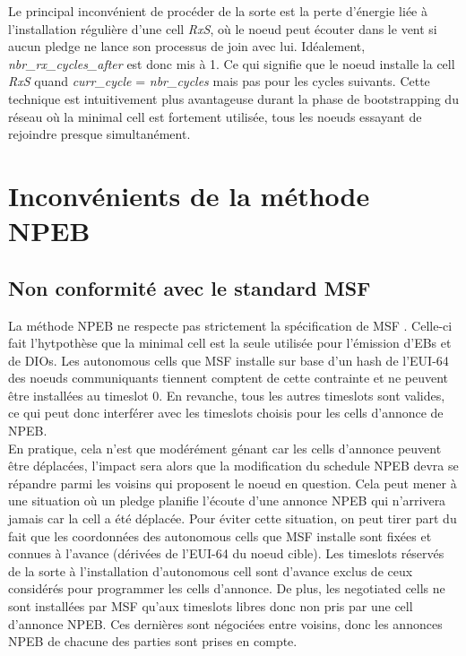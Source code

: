 \documentclass[]{report}
\begin{document}
Le principal inconvénient de procéder de la sorte est la perte d'énergie liée à l'installation régulière d'une cell \textit{RxS}, où le noeud peut écouter dans le vent si aucun pledge ne lance son processus de join avec lui. Idéalement, \textit{nbr\_rx\_cycles\_after} est donc mis à 1. Ce qui signifie que le noeud installe la cell \textit{RxS} quand \textit{curr\_cycle} = \textit{nbr\_cycles} mais pas pour les cycles suivants. Cette technique est intuitivement plus avantageuse durant la phase de bootstrapping du réseau où la minimal cell est fortement utilisée, tous les noeuds essayant de rejoindre presque simultanément.

\newpage

\section{Inconvénients de la méthode NPEB}

\subsection{Non conformité avec le standard MSF}

La méthode NPEB ne respecte pas strictement la spécification de MSF \cite{ietf-6tisch-msf-10}. Celle-ci fait l'hytpothèse que la minimal cell est la seule utilisée pour l'émission d'EBs et de DIOs. Les autonomous cells que MSF installe sur base d'un hash de l'EUI-64 des noeuds communiquants tiennent comptent de cette contrainte et ne peuvent être installées au timeslot 0. En revanche, tous les autres timeslots sont valides, ce qui peut donc interférer avec les timeslots choisis pour les cells d'annonce de NPEB.\\

En pratique, cela n'est que modérément génant car les cells d'annonce peuvent être déplacées, l'impact sera alors que la modification du schedule NPEB devra se répandre parmi les voisins qui proposent le noeud en question. Cela peut mener à une situation où un pledge planifie l'écoute d'une annonce NPEB qui n'arrivera jamais car la cell a été déplacée. Pour éviter cette situation, on peut tirer part du fait que les coordonnées des autonomous cells que MSF installe sont fixées et connues à l'avance (dérivées de l'EUI-64 du noeud cible). Les timeslots réservés de la sorte à l'installation d'autonomous cell sont d'avance exclus de ceux considérés pour programmer les cells d'annonce. De plus, les negotiated cells ne sont installées par MSF qu'aux timeslots libres donc non pris par une cell d'annonce NPEB. Ces dernières sont négociées entre voisins, donc les annonces NPEB de chacune des parties sont prises en compte.
\end{document}
